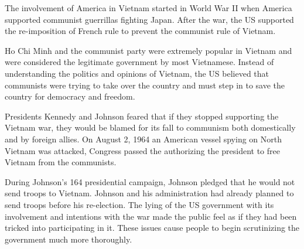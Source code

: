 The involvement of America in Vietnam started in World War II when America supported communist guerrillas fighting Japan.
After the war, the US supported the re-imposition of French rule to prevent the communist rule of Vietnam.

Ho Chi Minh and the communist party were extremely popular in Vietnam and were considered the legitimate government by most Vietnamese.
Instead of understanding the politics and opinions of Vietnam, the US believed that communists were trying to take over the country and must step in to save the country for democracy and freedom.

Presidents Kennedy and Johnson feared that if they stopped supporting the Vietnam war, they would be blamed for its fall to communism both domestically and by foreign allies.
On August 2, 1964 an American vessel spying on North Vietnam was attacked, Congress passed the  authorizing the president  to free Vietnam from the communists.

During Johnson's 164 presidential campaign, Johnson pledged that he would not send troops to Vietnam.
Johnson and his administration had already planned to send troops before his re-election.
The lying of the US government with its involvement and intentions with the war made the public feel as if they had been tricked into participating in it.
These issues cause people to begin scrutinizing the government much more thoroughly.